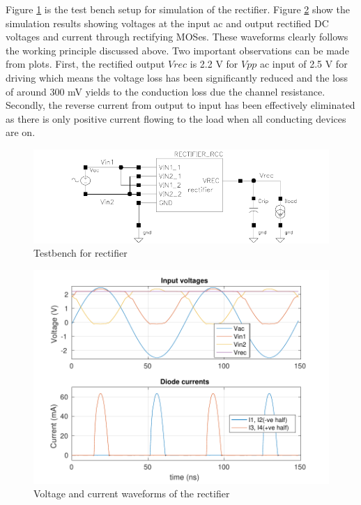 \documentclass[UKenglish]{ifimaster}  %
\begin{document}
Figure \ref{rect_tb} is the test bench setup for simulation of the rectifier. Figure \ref{rect_plot} show the simulation results showing voltages at the input ac and output rectified DC 
voltages and current through rectifying MOSes. These  
waveforms clearly follows the working principle discussed above. Two important observations can be made from 
plots. First, the rectified output $Vrec$ is 2.2 V for $Vpp$ ac input of 2.5 V for driving which means the 
voltage loss has been significantly reduced and the loss of around 300 mV yields to the conduction loss due 
the channel resistance. Secondly, the reverse current from output to input has been effectively eliminated as 
there is only positive current flowing to the load when all conducting devices 
are on.  \\

\begin{figure}[htbp] %
   \centering
   \includegraphics[width=\textwidth]{img/rectifier_testbench.pdf} 
   \caption{Testbench for rectifier}
   \label{rect_tb}
\end{figure}

\begin{figure}[H] %
   \centering
   \includegraphics[width=\textwidth]{img/rectifier_VI.pdf} 
   \caption{Voltage and current waveforms of the rectifier}
   \label{rect_plot}
\end{figure}
\end{document}
